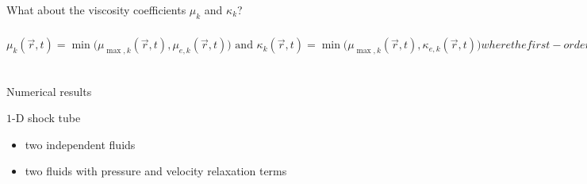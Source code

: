 \documentclass[xcolor=dvipsnames,10pt]{beamer}
\newcommand{\resi}{R}
\newcommand{\resinew}{\widetilde{\resi}}
\newcommand{\grad}{\boldsymbol{\nabla}}
\newcommand{\norm}{\textrm{norm}}
\begin{document}
\begin{frame}{What about the viscosity coefficients $\mu_k$ and $\kappa_k$?}
\begin{subequations}
%
\begin{equation}
\mu_k(\vec{r},t)    = \min \Big (\mu_{\max ,k}(\vec{r},t), \mu_{e,k} (\vec{r},t)    \Big) \text{  and  }
\kappa_k(\vec{r},t) = \min \Big (\mu_{\max ,k}(\vec{r},t), \kappa_{e,k} (\vec{r},t) \Big ) \nonumber
\end{equation}
%
where the first-order viscosity is given by
\begin{equation}
  \kappa_{\max ,k}(\vec{r},t)  = \mu_{\max ,k} (\vec{r},t) = \frac{h}{2} \Big ( ||\vec{u}_k|| + c_k \Big ) \nonumber
\end{equation}
%
and the entropy viscosity coefficients by 
%
\begin{equation}
\kappa_{e,k}(\vec{r},t) = \frac{h^2 \max(\resinew_k, J_k)}{ \rho_k c_k^2 }  \text{  and  }
\mu_{e,k}(\vec{r},t)    = \frac{h^2 \max(\resinew_k, J_k)}{ \norm_{P,k}^\mu} \nonumber
\end{equation}
%
where
%
\begin{equation}
\label{eq:norm_ent2}
\norm_{P,k}^\mu =  \left\{
\begin{array}{ll}
 \rho_k ||\vec{u}_k ||^2       & \text{ if } \left| \resinew_k^* \right| \geq M_k \text{ (i.e., non-isentropic flow)} \\
 \rho_k c_k^2 = \norm_{P,k}^\kappa & \text{ otherwise} 
\end{array}
\right. \nonumber
\end{equation}
% 
with the jumps given by
%
\begin{equation}
J_k = || \vec{u}_k || \max \Big ( [[ \grad P_k \cdot \vec{n} ]], c_k^2 [[\grad \rho_k \cdot \vec{n}]] \Big) \nonumber
\end{equation}
\end{subequations}
\end{frame}
\begin{frame}{Numerical results}
\begin{block}{$1$-D shock tube}
\begin{itemize}
\setlength{\itemsep}{10pt}
\item two independent fluids
\item two fluids with pressure and velocity relaxation terms
\end{itemize}
\end{block}
\end{frame}
\end{document}
